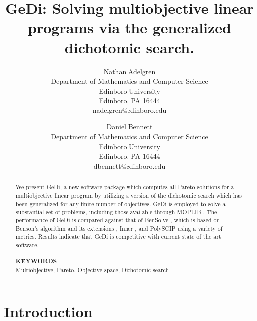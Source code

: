 \documentclass[12pt]{article}
\newcommand{\keywords}[1]{\textbf{\fontsize{10}{12}\selectfont KEYWORDS\\} #1}
\newcommand{\subclass}[1]{\textbf{MSC 2010.} #1}
\begin{document}
\title{GeDi: Solving multiobjective linear programs via the generalized dichotomic search.}
\author{Nathan Adelgren\\Department of Mathematics and Computer Science\\Edinboro University\\Edinboro, PA 16444\\nadelgren@edinboro.edu \and Daniel Bennett\\Department of Mathematics and Computer Science\\Edinboro University\\Edinboro, PA 16444\\dbennett@edinboro.edu}
\date{}


 \maketitle

\begin{abstract}
We present GeDi, a new software package which computes all Pareto solutions for a multiobjective linear program by utilizing a version of the dichotomic search \citep{cohon1978multiobjective,aneja1979bicriteria} which has been generalized for any finite number of objectives. GeDi is employed to solve a substantial set of problems, including those available through MOPLIB \citep{moplib}. The performance of GeDi is compared against that of BenSolve \citep{bensolve,lohne2017vector}, which is based on Benson's algorithm and its extensions \citep{benson1998outer,benson1998b,benson1998hybrid}, Inner \citep{inner,csirmaz2016using}, and PolySCIP \citep{Borndoerfer2016,polyscip} using a variety of metrics. Results indicate that GeDi is competitive with current state of the art software.\\~\\
\keywords{ Multiobjective, Pareto, Objective-space, Dichotomic search}
\end{abstract}
%

\section{Introduction}\label{intro}
\end{document}

